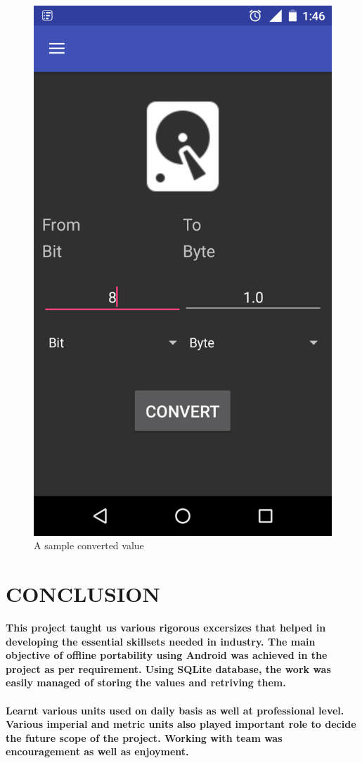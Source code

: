 \documentclass[a4paper, 12pt]{report}
\begin{document}
\begin{center}
\begin{figure}
\centering
\includegraphics[scale = 0.35]{./ss4}
\caption{A sample converted value}
\end{figure}
\end{center}

\chapter{CONCLUSION}
\hspace{0.8cm}\textbf{This project taught us various rigorous excersizes that helped in developing the essential skillsets needed in industry. The main objective of offline portability using Android was achieved in the project as per requirement. Using SQLite database, the work was easily managed of storing the values and retriving them.\\\\\hspace*{0.8cm}Learnt various units used on daily basis as well at professional level. Various imperial and metric units also played important role to decide the future scope of the project. Working with team was encouragement as well as enjoyment.}
\end{document}
